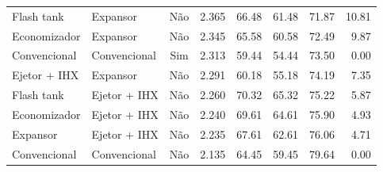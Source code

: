 {\begin{tabular}{llcrrrrr}
Flash tank & Expansor & Não & 2.365 & 66.48 & 61.48 & 71.87 & 10.81 \\
Economizador & Expansor & Não & 2.345 & 65.58 & 60.58 & 72.49 & 9.87 \\
Convencional & Convencional & Sim & 2.313 & 59.44 & 54.44 & 73.50 & 0.00 \\
Ejetor + IHX & Expansor & Não & 2.291 & 60.18 & 55.18 & 74.19 & 7.35 \\
Flash tank & Ejetor + IHX & Não & 2.260 & 70.32 & 65.32 & 75.22 & 5.87 \\
Economizador & Ejetor + IHX & Não & 2.240 & 69.61 & 64.61 & 75.90 & 4.93 \\
Expansor & Ejetor + IHX & Não & 2.235 & 67.61 & 62.61 & 76.06 & 4.71 \\
Convencional & Convencional & Não & 2.135 & 64.45 & 59.45 & 79.64 & 0.00 \\
\bottomrule
\end{tabular}
}
